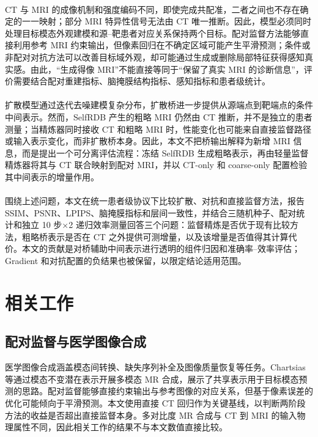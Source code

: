 \documentclass[UTF8,11pt,a4paper]{ctexart}
\begin{document}
\paragraph{}CT 与 MRI 的成像机制和强度编码不同，即使完成共配准，二者之间也不存在确定的一一映射；部分 MRI 特异性信号无法由 CT 唯一推断。因此，模型必须同时处理目标模态外观建模和源--靶患者对应关系保持两个目标。配对监督方法能够直接利用参考 MRI 约束输出，但像素回归在不确定区域可能产生平滑预测；条件或非配对对抗方法可以改善目标域外观，却可能通过生成或删除局部特征获得感知真实感\cite{dayarathna2024,isola2017,cohen2018}。由此，“生成得像 MRI”不能直接等同于“保留了真实 MRI 的诊断信息”，评价需要结合配对重建指标、脑掩膜结构指标、感知指标和患者级统计。

\paragraph{}扩散模型通过迭代去噪建模复杂分布，扩散桥进一步提供从源端点到靶端点的条件中间表示\cite{ho2020,kazerouni2023,arslan2025}。然而，SelfRDB 产生的粗略 MRI 仍然由 CT 推断，并不是独立的患者测量；当精炼器同时接收 CT 和粗略 MRI 时，性能变化也可能来自直接监督路径或输入表示变化，而非扩散桥本身。因此，本文不把桥输出解释为新增 MRI 信息，而是提出一个可分离评估流程：冻结 SelfRDB 生成粗略表示，再由轻量监督精炼器将其与 CT 联合映射到配对 MRI，并以 CT-only 和 coarse-only 配置检验其中间表示的增量作用。

\paragraph{}围绕上述问题，本文在统一患者级协议下比较扩散、对抗和直接监督方法，报告 SSIM、PSNR、LPIPS、脑掩膜指标和层间一致性，并结合三随机种子、配对统计和独立 10 步×2 递归效率测量回答三个问题：监督精炼是否优于现有比较方法，粗略桥表示是否在 CT 之外提供可测增量，以及该增量是否值得其计算代价。本文的贡献是对桥辅助中间表示进行透明的组件归因和准确率--效率评估；Gradient 和对抗配置的负结果也被保留，以限定结论适用范围。

\section{相关工作}
\subsection{配对监督与医学图像合成}
医学图像合成涵盖模态间转换、缺失序列补全及图像质量恢复等任务\cite{dayarathna2024}。Chartsias 等通过模态不变潜在表示开展多模态 MR 合成\cite{chartsias2018}，展示了共享表示用于目标模态预测的思路。配对监督能够直接约束输出与参考图像的对应关系，但基于像素误差的优化可能倾向于平滑预测。本文使用直接 CT 回归作为关键基线，以判断两阶段方法的收益是否超出直接监督本身。多对比度 MR 合成与 CT 到 MRI 的输入物理属性不同，因此相关工作的结果不与本文数值直接比较。
\end{document}
